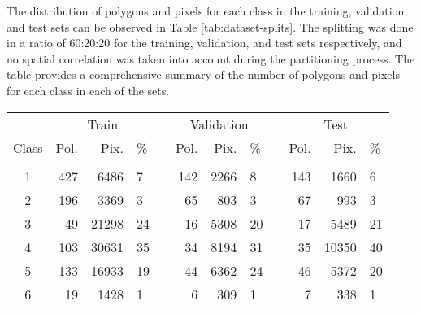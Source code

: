 The distribution of polygons and pixels for each class in the training, validation, and test sets can be observed in Table \ref{tab:dataset-splits}.
The splitting was done in a ratio of 60:20:20 for the training, validation, and test sets respectively, and no spatial correlation was taken into account during the partitioning process.
The table provides a comprehensive summary of the number of polygons and pixels for each class in each of the sets.

\begin{table}[H]
  \begin{tabular}{crrlcrrlcrrl}
     \cline{2-4} \cline{6-8} \cline{10-12} \\[-0.2cm]
          & \multicolumn{3}{c}{Train}                                 & \multicolumn{1}{l}{} & \multicolumn{3}{c}{Validation}                            & \multicolumn{1}{c}{} & \multicolumn{3}{c}{Test} \\[0.1cm]
    Class & Pol.                    & Pix.                      & \%  &                      & Pol.                    & Pix.  & \%                      &                      & Pol.   & Pix.    & \%    \\[0.2cm] \cline{2-4} \cline{6-8} \cline{10-12} \\[-0.2cm]
    1     & 427                     & 6486                      & 7   &                      & 142                     & 2266  & 8                       &                      & 143    & 1660    & 6     \\
    2     & 196                     & 3369                      & 3   &                      & 65                      & 803   & 3                       &                      & 67     & 993     & 3     \\
    3     & 49                      & 21298                     & 24  &                      & 16                      & 5308  & 20                      &                      & 17     & 5489    & 21    \\
    4     & 103                     & 30631                     & 35  &                      & 34                      & 8194  & 31                      &                      & 35     & 10350   & 40    \\
    5     & 133                     & 16933                     & 19  &                      & 44                      & 6362  & 24                      &                      & 46     & 5372    & 20    \\
    6     & 19                      & 1428                      & 1   &                      & 6                       & 309   & 1                       &                      & 7      & 338     & 1     \\

\end{tabular}
\end{table}

